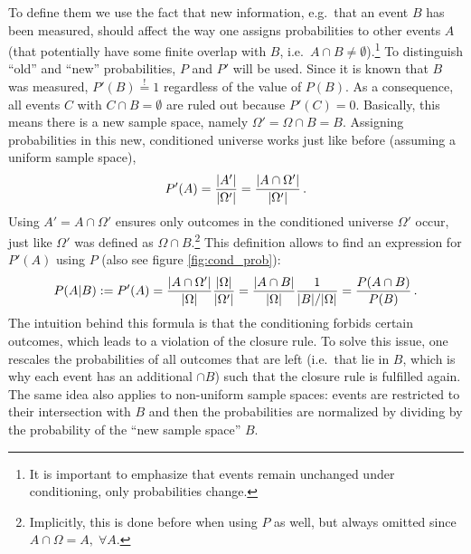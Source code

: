 To define them we use the fact that new information, e.g.~that an event $B$ has been measured, should affect the way one assigns probabilities to other events $A$ (that potentially have some finite overlap with $B$, i.e.~$A \cap B \neq \emptyset$).\footnote{It is important to emphasize that events remain unchanged under conditioning, only probabilities change.} To distinguish \enquote{old} and \enquote{new} probabilities, $P$ and $P'$ will be used. Since it is known that $B$ was measured, $P'(B) \overset{!}{=} 1$ regardless of the value of $P(B)$. As a consequence, all events $C$ with $C \cap B = \emptyset$ are ruled out because $P'(C) = 0$. Basically, this means there is a new sample space, namely $\Omega' = \Omega \cap B = B$. Assigning probabilities in this new, conditioned universe works just like before (assuming a uniform sample space),
\begin{equation*}
P'(A) = \frac{\abs{A'}}{\abs{\Omega'}} = \frac{\abs{A \cap \Omega'}}{\abs{\Omega'}} \, .
\end{equation*}
Using $A' = A \cap \Omega'$ ensures only outcomes in the conditioned universe $\Omega'$ occur, just like $\Omega'$ was defined as $\Omega \cap B$.\footnote{Implicitly, this is done before when using $P$ as well, but always omitted since $A \cap \Omega = A, \; \forall A$.} %
This definition allows to find an expression for $P'(A)$ using $P$ (also see figure \ref{fig:cond_prob}):
\begin{equation}
P(A | B) := P'(A) = \frac{\abs{A \cap \Omega'}}{\abs{\Omega}} \frac{\abs{\Omega}}{\abs{\Omega'}} = \frac{\abs{A \cap B}}{\abs{\Omega}} \frac{1}{\abs{B} / \abs{\Omega}} = \frac{P(A \cap B)}{P(B)} \, .
\end{equation}
The intuition behind this formula is that the conditioning forbids certain outcomes, which leads to a violation of the closure rule. To solve this issue, one rescales the probabilities of all outcomes that are left (i.e.~that lie in $B$, which is why each event has an additional $\cap B$) such that the closure rule is fulfilled again. The same idea also applies to non-uniform sample spaces: events are restricted to their intersection with $B$ and then the probabilities are normalized by dividing by the probability of the \enquote{new sample space} $B$.



